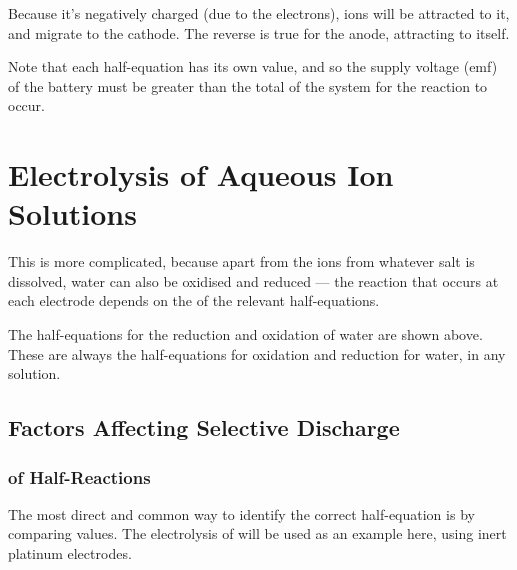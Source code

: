		Because it's negatively charged (due to the electrons),  ions will be attracted
		to it, and migrate to the cathode. The reverse is true for the anode, attracting \ch{\Cl-} to itself.

		Note that each half-equation has its own \Eo{} value, and so the supply voltage (emf) of the battery must be greater than the total
		\Ecell{} of the system for the reaction to occur.




	\pagebreak
	\section{Electrolysis of Aqueous Ion Solutions}

		This is more complicated, because apart from the ions from whatever salt is dissolved, water can also be oxidised and reduced --- the
		reaction that occurs at each electrode depends on the \Eo{} of the relevant half-equations.


		The half-equations for the reduction and oxidation of water are shown above. These are always the half-equations for oxidation and
		reduction for water, in any solution.

		\subsection{Factors Affecting Selective Discharge}

			\subsubsection{\texorpdfstring{\MEo{}}{Eo} of Half-Reactions}

				The most direct and common way to identify the correct half-equation is by comparing \Eo{} values.
				The electrolysis of  will be used as an example here, using inert platinum electrodes.



